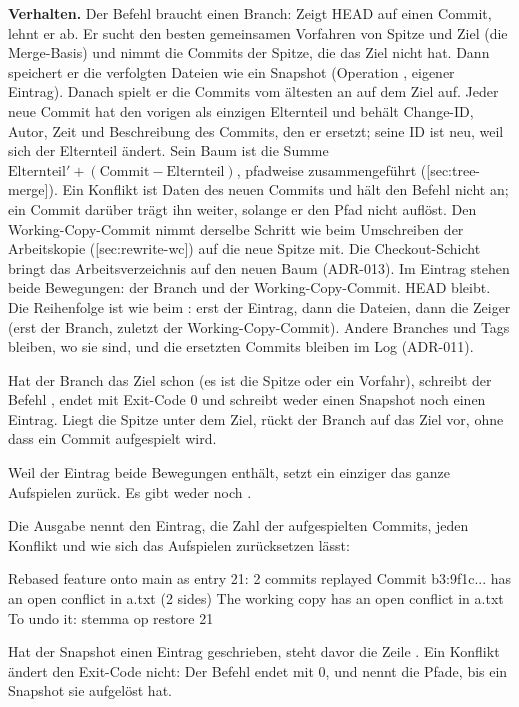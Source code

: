 {\bf Verhalten.} Der Befehl braucht einen Branch: Zeigt HEAD auf einen Commit, lehnt er ab.
Er sucht den besten gemeinsamen Vorfahren von Spitze und Ziel (die Merge-Basis)
und nimmt die Commits der Spitze, die das Ziel nicht hat.
Dann speichert er die verfolgten Dateien wie ein Snapshot
(Operation , eigener Eintrag).
Danach spielt er die Commits vom ältesten an auf dem Ziel auf.
Jeder neue Commit hat den vorigen als einzigen Elternteil und behält Change-ID, Autor, Zeit und
Beschreibung des Commits, den er ersetzt; seine ID ist neu, weil sich der Elternteil ändert.
Sein Baum ist die Summe $\mathrm{Elternteil}' + (\mathrm{Commit} - \mathrm{Elternteil})$,
pfadweise zusammengeführt ([sec:tree-merge]).
Ein Konflikt ist Daten des neuen Commits und hält den Befehl nicht an; ein Commit darüber trägt
ihn weiter, solange er den Pfad nicht auflöst.
Den Working-Copy-Commit nimmt derselbe Schritt wie beim Umschreiben der Arbeitskopie
([sec:rewrite-wc]) auf die neue Spitze mit.
Die Checkout-Schicht bringt das Arbeitsverzeichnis auf den neuen Baum (ADR-013).
Im Eintrag  stehen beide Bewegungen: der Branch und der Working-Copy-Commit.
HEAD bleibt. Die Reihenfolge ist wie beim : erst der Eintrag, dann die
Dateien, dann die Zeiger (erst der Branch, zuletzt der Working-Copy-Commit).
Andere Branches und Tags bleiben, wo sie sind, und die ersetzten Commits bleiben im Log (ADR-011).

Hat der Branch das Ziel schon (es ist die Spitze oder ein Vorfahr), schreibt der Befehl
, endet mit Exit-Code 0 und schreibt weder einen Snapshot noch
einen Eintrag. Liegt die Spitze unter dem Ziel, rückt der Branch auf das Ziel vor,
ohne dass ein Commit aufgespielt wird.

Weil der Eintrag beide Bewegungen enthält, setzt ein einziger  das ganze
Aufspielen zurück. Es gibt weder  noch .

Die Ausgabe nennt den Eintrag, die Zahl der aufgespielten Commits, jeden Konflikt und wie sich das
Aufspielen zurücksetzen lässt:

\starttyping
Rebased feature onto main as entry 21: 2 commits replayed
Commit b3:9f1c... has an open conflict in a.txt (2 sides)
The working copy has an open conflict in a.txt
To undo it: stemma op restore 21
\stoptyping

Hat der Snapshot einen Eintrag geschrieben, steht davor die Zeile
.
Ein Konflikt ändert den Exit-Code nicht: Der Befehl endet mit 0, und 
nennt die Pfade, bis ein Snapshot sie aufgelöst hat.

